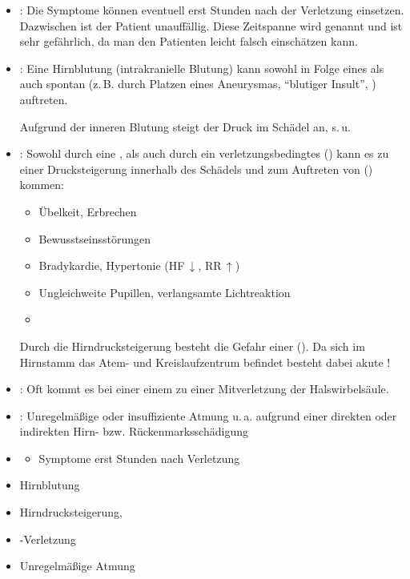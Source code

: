 \TextSlide{\TxGefahren}
{%
\begin{itemize}
  \item {}:
  Die
  Symptome können eventuell erst Stunden nach der Verletzung
  einsetzen. Dazwischen ist der Patient unauffällig.
  Diese Zeitspanne wird  genannt und ist sehr gefährlich, da man den
  Patienten leicht falsch einschätzen kann.
  \item {}:
  Eine Hirnblutung (intrakranielle Blutung) kann sowohl in
  Folge eines  als auch spontan (z.\,B. durch Platzen eines
  Aneurysmas, \enquote{blutiger Insult}, )
  auftreten.
  
  Aufgrund der inneren Blutung steigt der Druck im Schädel an, s.\,u.
  \item {}:
  Sowohl durch eine , 
  als auch durch ein verletzungsbedingtes  
  () 
  kann es zu einer Drucksteigerung innerhalb des Schädels
  und zum Auftreten von  
  () kommen:
  \begin{itemize}
    \item Übelkeit, Erbrechen
    \item Bewusstseinsstörungen
    \item Bradykardie, Hypertonie (HF\,$\downarrow$, RR\,$\uparrow$)
    \item Ungleichweite Pupillen, verlangsamte Lichtreaktion
    \item {}
  \end{itemize}
  
  
  Durch die Hirndrucksteigerung besteht die Gefahr einer 
  ().
  Da sich im Hirnstamm das Atem- und Kreislaufzentrum befindet besteht dabei 
  akute !
  \item {}:
  Oft kommt es bei einer einem  zu einer
  Mitverletzung der Halswirbelsäule.
  \item {} : 
  Unregelmäßige oder insuffiziente Atmung u.\,a. aufgrund einer direkten oder 
  indirekten Hirn- bzw. Rückenmarksschädigung
\end{itemize}
}{%
\begin{itemize}
  \item {}
  \begin{itemize}
    \item Symptome erst Stunden nach Verletzung
  \end{itemize}
  \item Hirnblutung 
  \item Hirndrucksteigerung, 
  \item {}-Verletzung
  \item Unregelmäßige Atmung
\end{itemize}
}{}{}{}

